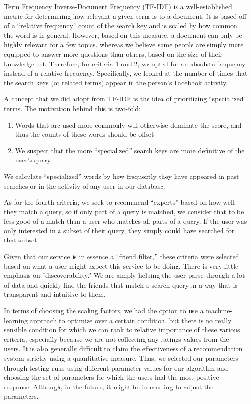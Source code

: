 Term Frequency Inverse-Document Frequency (TF-IDF) \cite{tfidf} is a
well-established metric for determining how relevant a given term is to a
document. It is based off of a ``relative frequency'' count of the search key
and is scaled by how common the word is in general. However, based on this
measure, a document can only be highly relevant for a few topics, whereas we
believe some people are simply more equipped to answer more questions than
others, based on the size of their knowledge set. Therefore, for criteria 1 and
2, we opted for an absolute frequency instead of a relative frequency.
Specifically, we looked at the number of times that the search keys (or related
terms) appear in the person's Facebook activity.

A concept that we did adopt from TF-IDF is the idea of prioritizing
``specialized'' terms. The motivation behind this is two-fold: \begin{enumerate}
\item Words that are used more commonly will otherwise dominate the score, and
thus the counts of these words should be offset
\item We suspect that the more ``specialized'' search keys are more definitive
of the user's query.
\end{enumerate}

We calculate ``specialized'' words by how frequently they have appeared in past
searches or in the activity of any user in our database.

As for the fourth criteria, we seek to recommend ``experts'' based on how well
they match a query, so if only part of a query is matched, we consider that to
be less good of a match than a user who matches all parts of a query. If the
user was only interested in a subset of their query, they simply could have
searched for that subset.

Given that our service is in essence a ``friend filter,'' these criteria were
selected based on what a user might expect this service to be doing. There is very
little emphasis on ``discoverability.'' We are simply helping the user parse
through a lot of data and quickly find the friends that match a search query
in a way that is transparent and intuitive to them.

In terms of choosing the scaling factors, we had the option to use a
machine-learning approach to optimize over a certain condition, but there is no
really sensible condition for which we can rank to relative importance of these
various criteria, especially because we are not collecting any ratings values
from the users. It is also generally difficult to claim the effectiveness of a
recommendation system strictly using a quantitative measure. Thus, we selected
our parameters through testing runs using different parameter values for our
algorithm and choosing the set of parameters for which the users had the most
positive response. Although, in the future, it might be interesting to adjust
the parameters.

